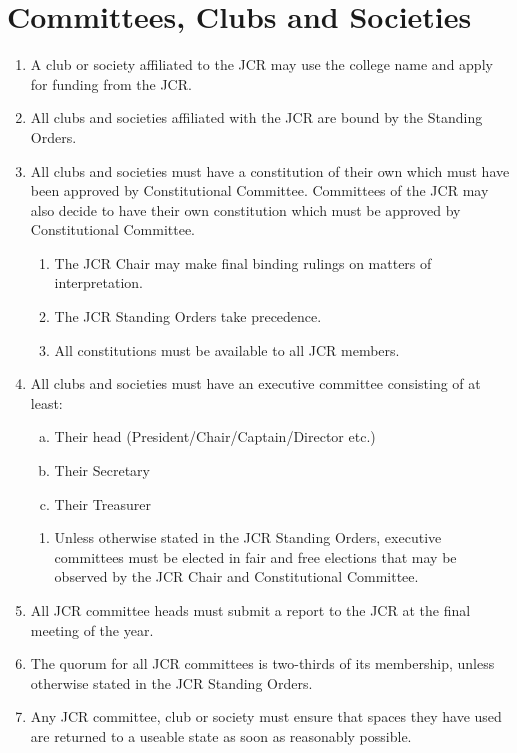 \documentclass[12pt]{article}  %
\begin{document}
\section{Committees, Clubs and Societies}
\begin{enumerate}
    \item A club or society affiliated to the JCR may use the college name and apply for funding from the JCR.
    \item All clubs and societies affiliated with the JCR are bound by the Standing Orders.
    \item All clubs and societies must have a constitution of their own which must have been approved by Constitutional Committee. Committees of the JCR may also decide to have their own constitution which must be approved by Constitutional Committee.
    \begin{enumerate}
        \item The JCR Chair may make final binding rulings on matters of interpretation. 
        \item The JCR Standing Orders take precedence.
        \item All constitutions must be available to all JCR members.
    \end{enumerate}
    \item All clubs and societies must have an executive committee consisting of at least:
    \begin{enumerate}[(a)]
        \item Their head (President/Chair/Captain/Director etc.)
        \item Their Secretary
        \item Their Treasurer
    \end{enumerate}
    \begin{enumerate}
        \item Unless otherwise stated in the JCR Standing Orders, executive committees must be elected in fair and free elections that may be observed by the JCR Chair and Constitutional Committee.
    \end{enumerate}
    \item All JCR committee heads must submit a report to the JCR at the final meeting of the year.
    \item The quorum for all JCR committees is two-thirds of its membership, unless otherwise stated in the JCR Standing Orders.
    \item Any JCR committee, club or society must ensure that spaces they have used are returned to a useable state as soon as reasonably possible.

\end{enumerate}
\end{document}
